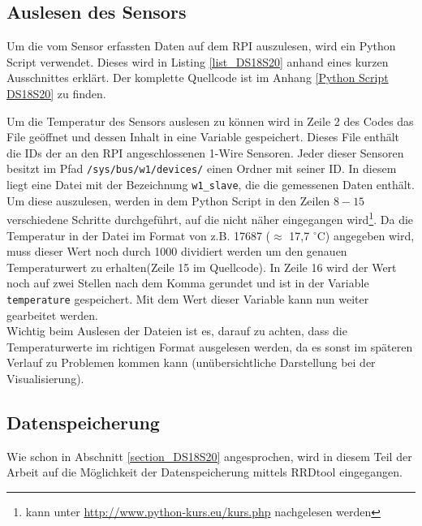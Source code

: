 \subsection{Auslesen des Sensors}
\label{subsection_Auslesen_DS18S20}
Um die vom Sensor erfassten Daten auf dem \ac{RPI} auszulesen, wird ein Python Script verwendet. Dieses wird in Listing \ref{list_DS18S20} anhand eines kurzen Ausschnittes erklärt. Der komplette Quellcode ist im Anhang \ref{Python Script DS18S20} zu finden.\\



Um die Temperatur des Sensors auslesen zu können wird in Zeile 2 des Codes das File geöffnet und dessen Inhalt in eine Variable gespeichert. Dieses File enthält die IDs der an den \ac{RPI} angeschlossenen 1-Wire Sensoren. Jeder dieser Sensoren besitzt im Pfad \texttt{/sys/bus/w1/devices/} einen Ordner mit seiner ID. In diesem liegt eine Datei mit der Bezeichnung \texttt{w1\_slave}, die die gemessenen Daten enthält. Um diese auszulesen, werden in dem Python Script in den Zeilen $8-15$ verschiedene Schritte durchgeführt, auf die nicht näher eingegangen wird\footnote{kann unter \url{http://www.python-kurs.eu/kurs.php} nachgelesen werden}. Da die Temperatur in der Datei im Format von z.B. 17687 ($\approx$ 17,7 $^\circ$C) angegeben wird, muss dieser Wert noch durch 1000 dividiert werden um den genauen Temperaturwert zu erhalten(Zeile 15 im Quellcode). In Zeile 16 wird der Wert noch auf zwei Stellen nach dem Komma gerundet und ist in der Variable \texttt{temperature} gespeichert. Mit dem Wert dieser Variable kann nun weiter gearbeitet werden.\\
Wichtig beim Auslesen der Dateien ist es, darauf zu achten, dass die Temperaturwerte im richtigen Format ausgelesen werden, da es sonst im späteren Verlauf zu Problemen kommen kann (unübersichtliche Darstellung bei der Visualisierung).

\subsection{Datenspeicherung}
\label{subsectio_Datenspeicherung_DS18S20}
Wie schon in Abschnitt \ref{section_DS18S20} angesprochen, wird in diesem Teil der Arbeit auf die Möglichkeit der Datenspeicherung mittels RRDtool eingegangen. 

